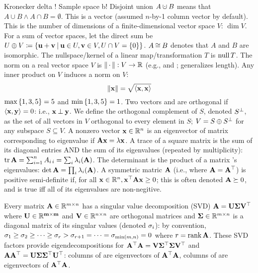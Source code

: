 \documentclass{article}
\begin{document}
\begin{solution}
    Kronecker delta ! Sample space \samplespace b! Disjoint union $A \cupdisjoint B$ means that $A \cup B \land A \cap B = \emptyset$. This is a vector  (assumed $n$-by-1 column vector by default). This is the number of dimensions of a finite-dimensional vector space $V$: $\dim V$. For a sum of vector spaces, let the direct sum be $U \mathbin{\oplus} V \coloneqq \left\{ \mathbf{u} + \mathbf{v} \mathbin{\mid} \mathbf{u} \in U, \mathbf{v} \in V, U \cap V = \left\{ 0 \right\} \right\}$. $A \mathbin{\cong} B$ denotes that $A$ and $B$ are isomorphic. The nullspace/kernel of a linear map/transformation $T$ is $\operatorname{null} T$. The norm on a real vector space $V$ is $\left\lVert {\ensuremath{\,\cdot\,}} \right\rVert : V \to \mathbb{R}$ (e.g.,  and ; generalizes length). Any inner product on $V$ induces a norm on $V$: $$\left\lVert \mathbf{x} \right\rVert = \sqrt{\left\langle \mathbf{x},\mathbf{x} \right\rangle}$$ $\operatorname*{\max} \left\{ 1,3,5 \right\} = 5$ and  $\min\left\{ 1,3,5 \right\} = 1$. Two vectors  and  are orthogonal if $\left\langle \mathbf{x},\mathbf{y} \right\rangle = 0$: i.e., $\mathbf{x} \mathbin{\bot} \mathbf{y}$. We define the orthogonal complement of $S$, denoted ${S}^\bot$, as the set of all vectors in $V$ orthogonal to every element in $S$; $V = S \mathbin{\oplus} {S}^\bot$ for any subspace $S \subseteq V$. A nonzero vector $\mathbf{x} \in \mathbb{R}^n$ is an eigenvector of matrix  corresponding to eigenvalue \eigenval if $\mathbf{A} \mathbf{x} = \lambda \mathbf{x}$. A trace of a square matrix is the sum of its diagonal entries AND the sum of its eigenvalues (repeated by multiplicity): $\operatorname{tr} \mathbf{A} = \sum_{i=1}^n A_{i\,i} = \sum_i \lambda_i(\mathbf{A})$. The determinant is the product of a matrix 's eigenvalues: $\det \mathbf{A} = \prod_i \lambda_i(\mathbf{A})$. A symmetric matric $\mathbf{A}$ (i.e., where $\mathbf{A} = {\mathbf{A}}^\top$) is positive semi-definite if, for all $\mathbf{x} \in \mathbb{R}^n, {\mathbf{x}}^\top \mathbf{A} \mathbf{x} \geq 0$; this is often denoted $\mathbf{A} \succeq 0$, and is true iff all of its eigenvalues are non-negitive.

    Every matrix $\mathbf{A} \in \mathbb{R}^{m \times n}$ has a singular value decomposition (SVD) $\mathbf{A} = \mathbf{U} \mathbf{\Sigma} {\mathbf{V}}^\top$ where $\mathbf{U \in \mathbb{R}^{m \times m}}$ and $\mathbf{V} \in \mathbb{R}^{n \times n}$ are orthogonal matrices and $\mathbf{\Sigma} \in \mathbb{R}^{m \times n}$ is a diagonal matrix of its singular values (denoted $\sigma_i$): by convention, $\sigma_1 \geq \sigma_2 \geq \cdots \geq \sigma_r > \sigma_{r+1} = \cdots = \sigma_{\min(m, n)} = 0$ where $r = \operatorname{rank} \mathbf{A}$. These SVD factors provide eigendecompositions for ${\mathbf{A}}^\top\mathbf{A} = \mathbf{V} {\mathbf{\Sigma}}^\top \mathbf{\Sigma} {\mathbf{V}}^\top$ and $\mathbf{A}{\mathbf{A}}^\top = \mathbf{U} \mathbf{\Sigma} {\mathbf{\Sigma}}^\top {\ensuremath{\mathbf{U}}}^\top$: columns of  are eigenvectors of ${\mathbf{A}}^\top\mathbf{A}$, columns of  are eigenvectors of ${\mathbf{A}}^\top\mathbf{A}$.


\end{solution}
\end{document}
